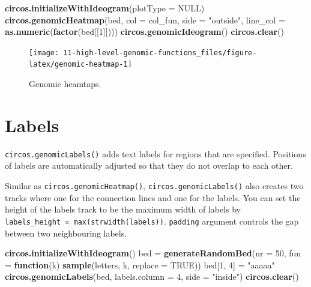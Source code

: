 \documentclass[]{book}
\newenvironment{Shaded}{\begin{snugshade}}{\end{snugshade}}
\newcommand{\KeywordTok}[1]{\textcolor[rgb]{0.13,0.29,0.53}{\textbf{#1}}}
\newcommand{\DataTypeTok}[1]{\textcolor[rgb]{0.13,0.29,0.53}{#1}}
\newcommand{\DecValTok}[1]{\textcolor[rgb]{0.00,0.00,0.81}{#1}}
\newcommand{\StringTok}[1]{\textcolor[rgb]{0.31,0.60,0.02}{#1}}
\newcommand{\OtherTok}[1]{\textcolor[rgb]{0.56,0.35,0.01}{#1}}
\newcommand{\ControlFlowTok}[1]{\textcolor[rgb]{0.13,0.29,0.53}{\textbf{#1}}}
\newcommand{\NormalTok}[1]{#1}
\theoremstyle{definition}
\theoremstyle{definition}
\theoremstyle{remark}
\begin{document}
\begin{Shaded}
\begin{Highlighting}[]
\KeywordTok{circos.initializeWithIdeogram}\NormalTok{(}\DataTypeTok{plotType =} \OtherTok{NULL}\NormalTok{)}
\KeywordTok{circos.genomicHeatmap}\NormalTok{(bed, }\DataTypeTok{col =}\NormalTok{ col_fun, }\DataTypeTok{side =} \StringTok{"outside"}\NormalTok{,}
    \DataTypeTok{line_col =} \KeywordTok{as.numeric}\NormalTok{(}\KeywordTok{factor}\NormalTok{(bed[[}\DecValTok{1}\NormalTok{]])))}
\KeywordTok{circos.genomicIdeogram}\NormalTok{()}
\KeywordTok{circos.clear}\NormalTok{()}
\end{Highlighting}
\end{Shaded}

\begin{figure}

{\centering \texttt{[image: 11-high-level-genomic-functions\_files/figure-latex/genomic-heatmap-1]} 

}

\caption{Genomic heamtaps.}\label{fig:genomic-heatmap}
\end{figure}

\section{Labels}\label{labels}

\texttt{circos.genomicLabels()} adds text labels for regions that are
specified. Positions of labels are automatically adjusted so that they
do not overlap to each other.

Similar as \texttt{circos.genomicHeatmap()},
\texttt{circos.genomicLabels()} also creates two tracks where one for
the connection lines and one for the labels. You can set the height of
the labels track to be the maximum width of labels by
\texttt{labels\_height\ =\ max(strwidth(labels))}. \texttt{padding}
argument controls the gap between two neighbouring labels.

\begin{Shaded}
\begin{Highlighting}[]
\KeywordTok{circos.initializeWithIdeogram}\NormalTok{()}
\NormalTok{bed =}\StringTok{ }\KeywordTok{generateRandomBed}\NormalTok{(}\DataTypeTok{nr =} \DecValTok{50}\NormalTok{, }\DataTypeTok{fun =} \ControlFlowTok{function}\NormalTok{(k) }\KeywordTok{sample}\NormalTok{(letters, k, }\DataTypeTok{replace =} \OtherTok{TRUE}\NormalTok{))}
\NormalTok{bed[}\DecValTok{1}\NormalTok{, }\DecValTok{4}\NormalTok{] =}\StringTok{ "aaaaa"}
\KeywordTok{circos.genomicLabels}\NormalTok{(bed, }\DataTypeTok{labels.column =} \DecValTok{4}\NormalTok{, }\DataTypeTok{side =} \StringTok{"inside"}\NormalTok{)}
\KeywordTok{circos.clear}\NormalTok{()}
\end{Highlighting}
\end{Shaded}
\end{document}

